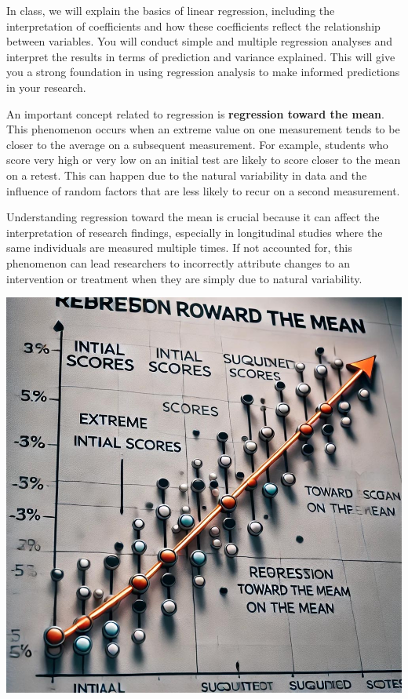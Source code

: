 \documentclass[
]{book}
\begin{document}
In class, we will explain the basics of linear regression, including the interpretation of coefficients and how these coefficients reflect the relationship between variables. You will conduct simple and multiple regression analyses and interpret the results in terms of prediction and variance explained. This will give you a strong foundation in using regression analysis to make informed predictions in your research.

An important concept related to regression is \textbf{regression toward the mean}. This phenomenon occurs when an extreme value on one measurement tends to be closer to the average on a subsequent measurement. For example, students who score very high or very low on an initial test are likely to score closer to the mean on a retest. This can happen due to the natural variability in data and the influence of random factors that are less likely to recur on a second measurement.

Understanding regression toward the mean is crucial because it can affect the interpretation of research findings, especially in longitudinal studies where the same individuals are measured multiple times. If not accounted for, this phenomenon can lead researchers to incorrectly attribute changes to an intervention or treatment when they are simply due to natural variability.

\includegraphics[width=1\textwidth,height=\textheight]{images/fig062.jpg}
\end{document}
